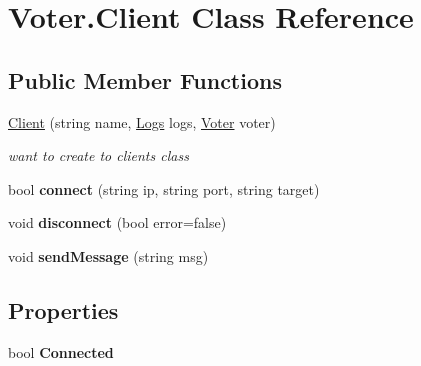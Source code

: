 \hypertarget{class_voter_1_1_client}{}\section{Voter.\+Client Class Reference}
\label{class_voter_1_1_client}
\subsection*{Public Member Functions}
\begin{DoxyCompactItemize}
\item 
\hyperlink{class_voter_1_1_client_a7c5aaaf36e47afb15456386046f4ff9e}{Client} (string name, \hyperlink{class_voter_1_1_logs}{Logs} logs, \hyperlink{class_voter_1_1_voter}{Voter} voter)
\begin{DoxyCompactList}\small\item\em want to create to clients class \end{DoxyCompactList}\item 
\hypertarget{class_voter_1_1_client_a1eaed52639e4329fc4fbee73d3a009a5}{}bool {\bfseries connect} (string ip, string port, string target)\label{class_voter_1_1_client_a1eaed52639e4329fc4fbee73d3a009a5}

\item 
\hypertarget{class_voter_1_1_client_a282dae7ecdd0e91620eaea5e2e865954}{}void {\bfseries disconnect} (bool error=false)\label{class_voter_1_1_client_a282dae7ecdd0e91620eaea5e2e865954}

\item 
\hypertarget{class_voter_1_1_client_afdcbac58418997a4dff458d1d3c705c1}{}void {\bfseries send\+Message} (string msg)\label{class_voter_1_1_client_afdcbac58418997a4dff458d1d3c705c1}

\end{DoxyCompactItemize}
\subsection*{Properties}
\begin{DoxyCompactItemize}
\item 
\hypertarget{class_voter_1_1_client_aa193bb9f7206fba81e57aae4aa3c11bd}{}bool {\bfseries Connected}\label{class_voter_1_1_client_aa193bb9f7206fba81e57aae4aa3c11bd}

\end{DoxyCompactItemize}


